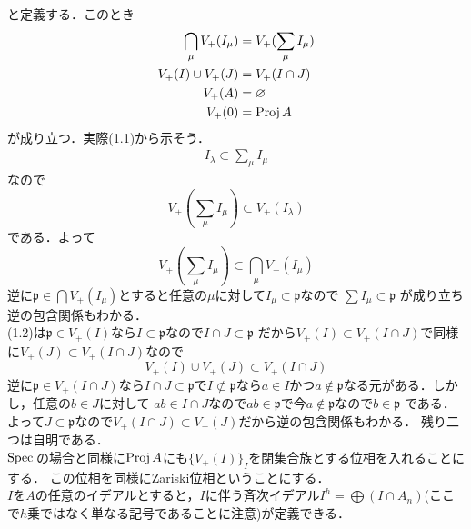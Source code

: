 と定義する．このとき
\begin{align}
  \bigcap_{\mu}V_{+}(I_{\mu}) &= V_{+}(\sum_{\mu}I_{\mu})\\
  V_{+}(I)\cup V_{+}(J) &= V_{+}(I\cap J)\\
  V_{+}(A) &= \varnothing\\
  V_{+}(0) &= \mathrm{Proj}\, A
\end{align}
が成り立つ．実際(1.1)から示そう．
\begin{align*}
  I_{\lambda} \subset \sum_{\mu}I_{\mu}
\end{align*}
なので
\begin{equation*}
  V_{+}(\sum_{\mu}I_{\mu}) \subset V_{+}(I_{\lambda})
\end{equation*}
である．よって
\begin{equation*}
  V_{+}(\sum_{\mu}I_{\mu}) \subset \bigcap_{\mu}V_{+}(I_{\mu})
\end{equation*}
逆に$\mathfrak{p} \in \bigcap V_{+}(I_{\mu})$とすると任意の$\mu$に対して$I_{\mu} \subset \mathfrak{p}$なので
$\sum I_{\mu}\subset \mathfrak{p}$ が成り立ち逆の包含関係もわかる．\\
(1.2)は$\mathfrak{p} \in V_{+}(I)$なら$I \subset \mathfrak{p}$なので$I\cap J \subset \mathfrak{p}$
だから$V_{+}(I)\subset V_{+}(I\cap J)$で同様に$V_{+}(J) \subset V_{+}(I\cap J)$なので
\begin{equation*}
  V_{+}(I)\cup V_{+}(J) \subset V_{+}(I\cap J)
\end{equation*}
逆に$\mathfrak{p} \in V_{+}(I\cap J)$なら$I\cap J \subset \mathfrak{p}$で$I\not\subset \mathfrak{p}$なら$a\in I$かつ$a\notin \mathfrak{p}$なる元がある．しかし，任意の$b\in J$に対して
$ab \in I\cap J$なので$ab \in \mathfrak{p}$で今$a\notin \mathfrak{p}$なので$b\in \mathfrak{p}$
である．よって$J\subset \mathfrak{p}$なので$V_{+}(I\cap J)\subset V_{+}(J)$だから逆の包含関係もわかる．
残り二つは自明である．\\
$\spec$の場合と同様に$\mathrm{Proj}\, A$にも$\{V_{+}(I)\}_{I}$を閉集合族とする位相を入れることにする．
この位相を同様にZariski位相ということにする．\\
$I$を$A$の任意のイデアルとすると，$I$に伴う斉次イデアル$I^{h} = \bigoplus(I\cap A_{n})$(ここで$h$乗ではなく単なる記号であることに注意)が定義できる．
